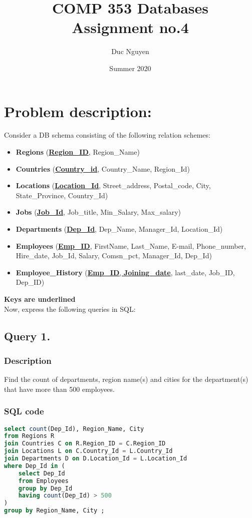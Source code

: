 \documentclass[a4paper]{article}
\title{COMP 353 Databases\\
Assignment no.4}
\author{Duc Nguyen}
\affil{Gina Cody School of Computer Science and Software Engineering \\
    Concordia University, Montreal, QC, Canada}
\date{Summer 2020}
\begin{document}
\maketitle

\newpage
\tableofcontents
\newpage

\section{Problem description:}
Consider a DB schema consisting of the following relation schemes:
\begin{itemize}
    \item \textbf{Regions} (\underline{\textbf{Region\_ID}}, Region\_Name)
    \item \textbf{Countries} (\underline{\textbf{Country\_id}}, Country\_Name, Region\_Id)
    \item \textbf{Locations} (\underline{\textbf{Location\_Id}}, Street\_address, Postal\_code, City, State\_Province, Country\_Id)
    \item \textbf{Jobs} (\underline{\textbf{Job\_Id}},  Job\_title, Min\_Salary, Max\_salary)
    \item \textbf{Departments} (\underline{\textbf{Dep\_Id}},  Dep\_Name, Manager\_Id,
Location\_Id)
    \item \textbf{Employees} (\underline{\textbf{Emp\_ID}},  FirstName, Last\_Name, E-mail,
Phone\_number, Hire\_date, Job\_Id, Salary, Comsn\_pct,
Manager\_Id, Dep\_Id)
    \item \textbf{Employee\_History} (\underline{\textbf{Emp\_ID}, \textbf{Joining\_date}}, last\_date, Job\_ID, Dep\_ID)
\end{itemize}

\textbf{Keys are underlined} \\
Now, express the following queries in SQL:
\newpage
\subsection{Query 1.}
\subsubsection{Description}
Find the count of departments, region name(s) and cities for the department(s)
that have more than 500 employees.
\subsubsection{SQL code}
\begin{lstlisting}[language=SQL]
select count(Dep_Id), Region_Name, City
from Regions R
join Countries C on R.Region_ID = C.Region_ID 
join Locations L on C.Country_Id = L.Country_Id 
join Departments D on D.Location_Id = L.Location_Id
where Dep_Id in (
    select Dep_Id 
    from Employees
    group by Dep_Id 
    having count(Dep_Id) > 500
)
group by Region_Name, City ;
\end{lstlisting}
\end{document}
